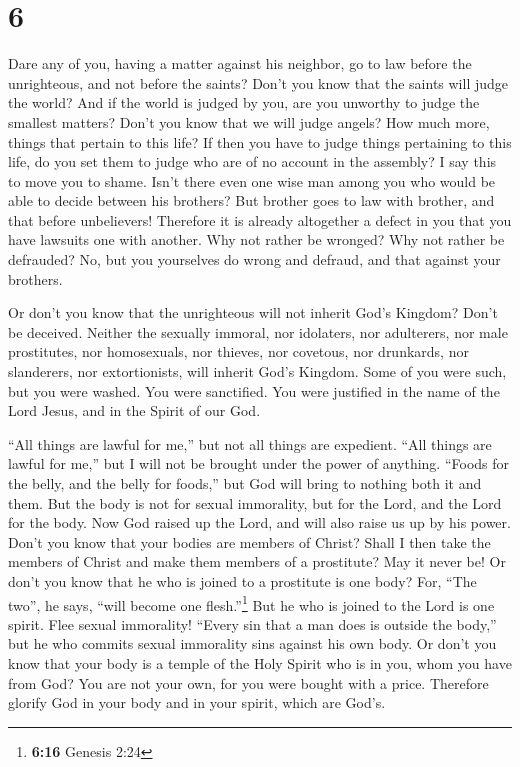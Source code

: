 \hypertarget{section-5}{%
\section{6}\label{section-5}}

 Dare any of you, having a matter against his neighbor, go
to law before the unrighteous, and not before the saints? 
Don't you know that the saints will judge the world? And if the world is
judged by you, are you unworthy to judge the smallest matters?
 Don't you know that we will judge angels? How much more,
things that pertain to this life?  If then you have to
judge things pertaining to this life, do you set them to judge who are
of no account in the assembly?  I say this to move you to
shame. Isn't there even one wise man among you who would be able to
decide between his brothers?  But brother goes to law with
brother, and that before unbelievers!  Therefore it is
already altogether a defect in you that you have lawsuits one with
another. Why not rather be wronged? Why not rather be defrauded?
 No, but you yourselves do wrong and defraud, and that
against your brothers.

 Or don't you know that the unrighteous will not inherit
God's Kingdom? Don't be deceived. Neither the sexually immoral, nor
idolaters, nor adulterers, nor male prostitutes, nor homosexuals,
 nor thieves, nor covetous, nor drunkards, nor
slanderers, nor extortionists, will inherit God's Kingdom.
 Some of you were such, but you were washed. You were
sanctified. You were justified in the name of the Lord Jesus, and in the
Spirit of our God.

 ``All things are lawful for me,'' but not all things are
expedient. ``All things are lawful for me,'' but I will not be brought
under the power of anything.  ``Foods for the belly, and
the belly for foods,'' but God will bring to nothing both it and them.
But the body is not for sexual immorality, but for the Lord, and the
Lord for the body.  Now God raised up the Lord, and will
also raise us up by his power.  Don't you know that your
bodies are members of Christ? Shall I then take the members of Christ
and make them members of a prostitute? May it never be! 
Or don't you know that he who is joined to a prostitute is one body?
For, ``The two'', he says, ``will become one flesh.''\footnote{\textbf{6:16}
  Genesis 2:24}  But he who is joined to the Lord is one
spirit.  Flee sexual immorality! ``Every sin that a man
does is outside the body,'' but he who commits sexual immorality sins
against his own body.  Or don't you know that your body
is a temple of the Holy Spirit who is in you, whom you have from God?
You are not your own,  for you were bought with a price.
Therefore glorify God in your body and in your spirit, which are God's.

